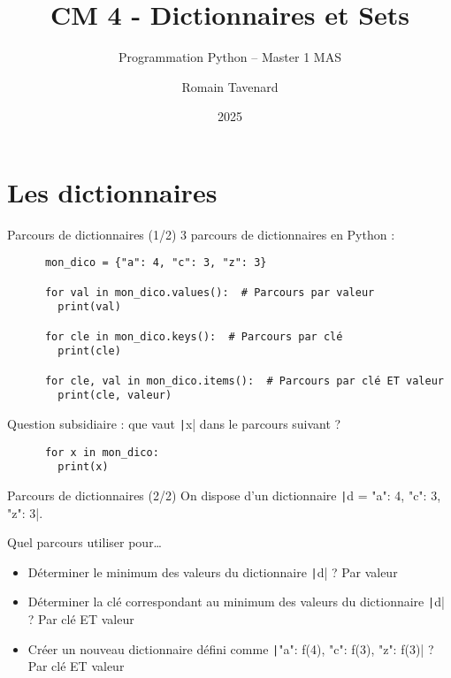 \documentclass[10pt]{beamer}
\title[M1 MAS -- Python -- Dictionnaires]{CM 4 - Dictionnaires et Sets}
\subtitle{Programmation Python -- Master 1 MAS}
\author{Romain Tavenard}
\date{2025}
\institute{%
\hypersetup{urlcolor=.}
\makebox[2.2ex][c]{\faEnvelope}\enspace\href{mailto:romain.tavenard@univ-rennes2.fr}{\texttt{romain.tavenard@univ-rennes2.fr}}\\%
}
\begin{document}
\maketitle

\section{Les dictionnaires}

\begin{frame}[fragile]{Parcours de dictionnaires (1/2)}  
  3 parcours de dictionnaires en Python :

  \begin{beamercodeblock}
    \begin{verbatim}
      mon_dico = {"a": 4, "c": 3, "z": 3}

      for val in mon_dico.values():  # Parcours par valeur
        print(val)

      for cle in mon_dico.keys():  # Parcours par clé
        print(cle)
      
      for cle, val in mon_dico.items():  # Parcours par clé ET valeur
        print(cle, valeur)
    \end{verbatim}
  \end{beamercodeblock}

  \pause

  Question subsidiaire : que vaut \texttt|x| dans le parcours suivant ?

  \begin{beamercodeblock}
    \begin{verbatim}
      for x in mon_dico:
        print(x)
    \end{verbatim}
  \end{beamercodeblock}
\end{frame}

\begin{frame}[fragile]{Parcours de dictionnaires (2/2)}  
  On dispose d'un dictionnaire \texttt|d = {"a": 4, "c": 3, "z": 3}|.

  Quel parcours utiliser pour\dots

  \begin{itemize}
    \item Déterminer le minimum des valeurs du dictionnaire \texttt|d| ? \pause \alert{Par valeur}
    \item Déterminer la clé correspondant au minimum des valeurs du dictionnaire \texttt|d| ? \pause \alert{Par clé ET valeur}
    \item Créer un nouveau dictionnaire défini comme \texttt|{"a": f(4), "c": f(3), "z": f(3)}| ? \pause \alert{Par clé ET valeur}
  \end{itemize}
\end{frame}
\end{document}

